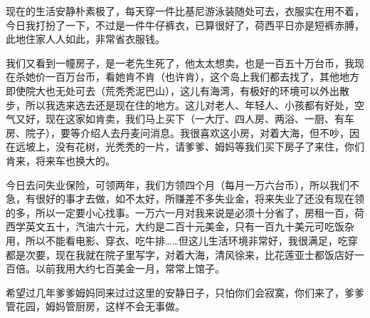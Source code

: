 \par {}
\par 现在的生活安静朴素极了，每天穿一件比基尼游泳装随处可去，衣服实在用不着，今日我打扮了一下，不过是一件牛仔裤衣，已算很好了，荷西平日亦是短裤赤膊，此地住家人人如此，非常省衣服钱。
\par 我们又看到一幢房子，是一老先生死了，他太太想卖，也是一百五十万台币，我现在杀她价一百万台币，看她肯不肯（也许肯），这个岛上我们都去找了，其他地方即使院大也无处可去（荒秃秃泥巴山），这儿有海湾，有极好的环境可以外出散步，所以我选来选去还是现在住的地方。这儿对老人、年轻人、小孩都有好处，空气又好，现在这家如肯卖，我们马上买下（一大厅、四人房、两浴、一厨、有车房、院子），要等介绍人去丹麦问消息。我很喜欢这小房，对着大海，但不吵，因在远坡上，没有花树，光秃秃的一片，请爹爹、姆妈等我们买下房子了来住，你们肯来，将来车也换大的。
\par 今日去问失业保险，可领两年，我们方领四个月（每月一万六台币），所以我们不急，有很好的事才去做，如不太好，所赚差不多失业金，将来失业了还没有现在领的多，所以一定要小心找事。一万六一月对我来说是必须十分省了，房租一百，荷西学英文五十，汽油六十元，大约是二百十元美金，只有一百九十美元可吃饭杂用，所以不能看电影、穿衣、吃牛排……但这儿生活环境非常好，我很满足，吃穿都是次要，现在我就在院子里写字，对着大海，清风徐来，比花莲亚士都饭店好一百倍。以前我用大约七百美金一月，常常上馆子。
\par 希望过几年爹爹姆妈同来过过这里的安静日子，只怕你们会寂寞，你们来了，爹爹管花园，姆妈管厨房，这样不会无事做。
\par  
\par {}








